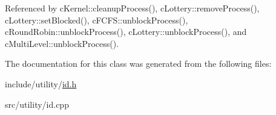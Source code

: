 \-Referenced by c\-Kernel\-::cleanup\-Process(), c\-Lottery\-::remove\-Process(), c\-Lottery\-::set\-Blocked(), c\-F\-C\-F\-S\-::unblock\-Process(), c\-Round\-Robin\-::unblock\-Process(), c\-Lottery\-::unblock\-Process(), and c\-Multi\-Level\-::unblock\-Process().



\-The documentation for this class was generated from the following files\-:\begin{DoxyCompactItemize}
\item 
include/utility/\hyperlink{id_8h}{id.\-h}\item 
src/utility/id.\-cpp\end{DoxyCompactItemize}
